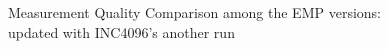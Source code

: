\documentclass[10pt]{article}
\begin{document}
\begin{figure}[htp!]
	\centering
    \caption{Measurement Quality Comparison among the EMP versions: updated with INC4096's another run}
    \label{fig:emp_comp}
\end{figure}


\end{document}
